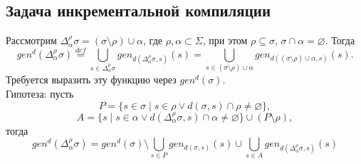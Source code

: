 \subsection{Задача инкрементальной компиляции}

\newcommand{\Deltasigma}{\Delta_\alpha^\rho\sigma}
Рассмотрим $\Deltasigma = (\sigma \setminus \rho) \cup \alpha$, где $\rho, \alpha \subset \Sigma$, при этом $\rho \subseteq \sigma$, $\sigma \cap \alpha = \varnothing$. Тогда
$$gen^d(\Deltasigma) \overset{def}{=} \bigcup\limits_{s \in \Deltasigma} gen_{d(\Deltasigma, s)}(s) = \bigcup\limits_{s \in (\sigma \setminus \rho) \cup \alpha} gen_{d((\sigma \setminus \rho) \cup \alpha, s)}(s).$$
Требуется выразить эту функцию через $gen^d(\sigma)$.\\
Гипотеза: пусть
$$P = \{s \in \sigma \mid s \in \rho \vee d(\sigma, s) \cap \rho \neq \varnothing \},$$
$$A = \{s \mid s \in \alpha \vee d(\Deltasigma, s) \cap \alpha \neq \varnothing \} \cup (P \setminus \rho),$$
тогда
$$gen^d(\Deltasigma) = gen^d(\sigma) \setminus \bigcup\limits_{s \in P} gen_{d(\sigma, s)}(s) \cup \bigcup\limits_{s \in A} gen_{d(\Deltasigma, s)}(s)$$